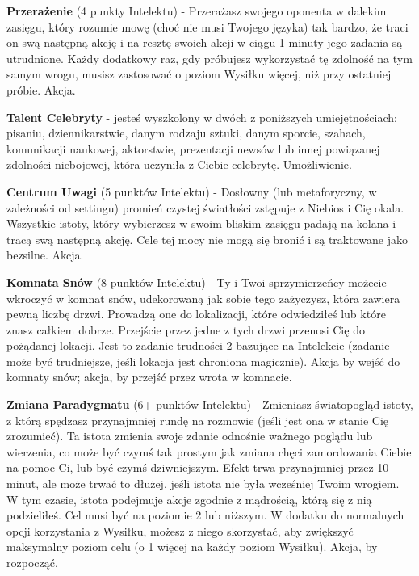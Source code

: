 {\textbf{Przerażenie}\label{sec:Przerażenie} (4 punkty Intelektu) - Przerażasz swojego oponenta w dalekim zasięgu, który rozumie mowę (choć nie musi Twojego języka) tak bardzo, że traci on swą następną akcję i na resztę swoich akcji w ciągu 1 minuty jego zadania są utrudnione. Każdy dodatkowy raz, gdy próbujesz wykorzystać tę zdolność na tym samym wrogu, musisz zastosować o poziom Wysiłku więcej, niż przy ostatniej próbie. Akcja. 

\textbf{Talent Celebryty}\label{sec:Talent Celebryty} - jesteś wyszkolony w dwóch z poniższych umiejętnościach: pisaniu, dziennikarstwie, danym rodzaju sztuki, danym sporcie, szahach, komunikacji naukowej, aktorstwie, prezentacji newsów lub innej powiązanej zdolności niebojowej, która uczyniła z Ciebie celebrytę. Umożliwienie. 

\textbf{Centrum Uwagi}\label{sec:Centrum Uwagi} (5 punktów Intelektu) - Dosłowny (lub metaforyczny, w zależności od settingu) promień czystej światłości zstępuje z Niebios i Cię okala. Wszystkie istoty, który wybierzesz w swoim bliskim zasięgu padają na kolana i tracą swą następną akcję. Cele tej mocy nie mogą się bronić i są traktowane jako bezsilne. Akcja.

\textbf{Komnata Snów}\label{sec:Komnata Snów} (8 punktów Intelektu) - Ty i Twoi sprzymierzeńcy możecie wkroczyć w komnat snów, udekorowaną jak sobie tego zażyczysz, która zawiera pewną liczbę drzwi. Prowadzą one do lokalizacji, które odwiedziłeś lub które znasz całkiem dobrze. Przejście przez jedne z tych drzwi przenosi Cię do pożądanej lokacji. Jest to zadanie trudności 2 bazujące na Intelekcie (zadanie może być trudniejsze, jeśli lokacja jest chroniona magicznie). Akcja by wejść do komnaty snów; akcja, by przejść przez wrota w komnacie.

\textbf{Zmiana Paradygmatu}\label{sec:Zmiana Paradygmatu} (6+ punktów Intelektu) - Zmieniasz światopogląd istoty, z którą spędzasz przynajmniej rundę na rozmowie (jeśli jest ona w stanie Cię zrozumieć). Ta istota zmienia swoje zdanie odnośnie ważnego poglądu lub wierzenia, co może być czymś tak prostym jak zmiana chęci zamordowania Ciebie na pomoc Ci, lub być czymś dziwniejszym. Efekt trwa przynajmniej przez 10 minut, ale może trwać to dłużej, jeśli istota nie była wcześniej Twoim wrogiem. W tym czasie, istota podejmuje akcje zgodnie z mądrością, którą się z nią podzieliłeś. Cel musi być na poziomie 2 lub niższym. W dodatku do normalnych opcji korzystania z Wysiłku, możesz z niego skorzystać, aby zwiększyć maksymalny poziom celu (o 1 więcej na każdy poziom Wysiłku). Akcja, by rozpocząć.

}
